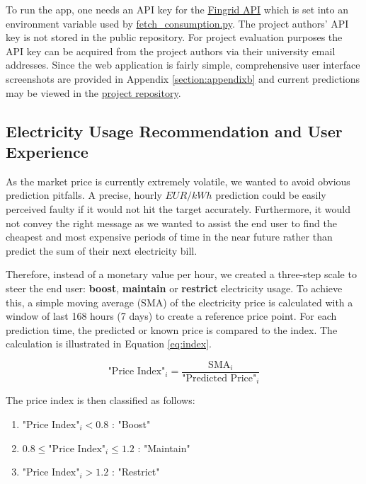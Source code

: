 \documentclass{article}
\begin{document}
To run the app, one needs an API key for the \href{https://data.fingrid.fi/open-data-forms/registration/}{Fingrid API} which is set into an environment variable used by \href{https://github.com/IDS-mini/electricity/blob/main/src/app/utils/fetch_consumption.py}{fetch\_consumption.py}. The project authors' API key is not stored in the public repository. For project evaluation purposes the API key can be acquired from the project authors via their university email addresses. Since the web application is fairly simple, comprehensive user interface screenshots are provided in Appendix \ref{section:appendixb} and current predictions may be viewed in the \href{https://github.com/IDS-mini/electricity/blob/main/forecast_data/forecasts.csv}{project repository}.

\subsection{Electricity Usage Recommendation and User Experience}
\label{subsection:ux}

As the market price is currently extremely volatile, we wanted to avoid obvious prediction pitfalls. A precise, hourly $EUR/kWh$ prediction could be easily perceived faulty if it would not hit the target accurately. Furthermore, it would not convey the right message as we wanted to assist the end user to find the cheapest and most expensive periods of time in the near future rather than predict the sum of their next electricity bill.

Therefore, instead of a monetary value per hour, we created a three-step scale to steer the end user: \textbf{boost}, \textbf{maintain} or \textbf{restrict} electricity usage. To achieve this, a simple moving average (SMA) of the electricity price is calculated with a window of last 168 hours (7 days) to create a reference price point. For each prediction time, the predicted or known price is compared to the index. The calculation is illustrated in Equation \ref{eq:index}.


\begin{equation} \label{eq:index}
\text{"Price Index"}_i = \frac{\text{SMA}_i}{\text{"Predicted Price"}_i}
\end{equation}

The price index is then classified as follows:

\begin{enumerate}
    \item $\text{"Price Index"}_i < 0.8$ : "Boost"
    \item $0.8 \leq \text{"Price Index"}_i \leq 1.2$ : "Maintain"
    \item $\text{"Price Index"}_i > 1.2$ : "Restrict"
\end{enumerate}
\end{document}
